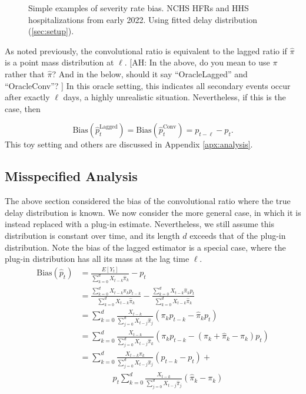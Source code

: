 \documentclass{article}
\newcommand{\ahcomment}[1]{{\color{teal}[AH: #1]}}
\begin{document}
\begin{figure}
\begin{subfigure}[b]{0.32\linewidth}
         \caption{}
         \label{fig:toy_primary}
     \end{subfigure}
        \caption{Simple examples of severity rate bias. NCHS HFRs and HHS hospitalizations from early 2022. Using fitted delay distribution (\ref{sec:setup}).}
        \label{fig:bias_ex_main}
\end{figure}


As noted previously, the convolutional ratio is equivalent to the lagged ratio if $\hat\pi$ is a point mass distribution at $\ell$.
\ahcomment{
  In the above, do you mean to use $\pi$ rather that $\hat{\pi}$?  And in the
  below, should it say ``OracleLagged'' and ``OracleConv''?
}
In this oracle setting, this indicates all secondary events occur after exactly $\ell$ days, a highly unrealistic situation. Nevertheless, if this is the case, then 

$$\text{Bias}(\hat{p}_t^\text{Lagged}) = \text{Bias}(\hat{p}_t^\text{Conv}) = p_{t-\ell}-p_t.$$
\noindent This toy setting and others are discussed in Appendix \ref{apx:analysis}.

\subsection{Misspecified Analysis}

The above section considered the bias of the convolutional ratio where the true delay distribution is known. We now consider the more general case, in which it is instead replaced with a plug-in estimate. Nevertheless, we still assume this distribution is constant over time, and its length $d$ exceeds that of the plug-in distribution. Note the bias of the lagged estimator is a special case, where the plug-in distribution has all its mass at the lag time $\ell$. 
\begin{align}\label{eq:MispBias}
    \text{Bias}(\hat{p}_t) &= \frac{E[Y_t]}{\sum_{k=0}^d X_{t-k}\hat\pi_k} - p_t \nonumber\\
    &= \frac{\sum_{k=0}^d X_{t-k}\pi_k p_{t-k}}{\sum_{k=0}^d X_{t-k}\hat\pi_k} - \frac{\sum_{k=0}^d X_{t-k}\hat\pi_k p_t}{\sum_{k=0}^d X_{t-k}\hat\pi_k}\nonumber \\
    &= \sum_{k=0}^d \frac{X_{t-k}}{\sum_{j=0}^d X_{t-j}\hat\pi_j}(\pi_k p_{t-k}-\hat\pi_k p_t)\nonumber \\
    &= \sum_{k=0}^d \frac{X_{t-k}}{\sum_{j=0}^d X_{t-j}\hat\pi_k}(\pi_k p_{t-k}-(\pi_k +\hat\pi_k-\pi_k) p_t)\nonumber \\
     &= \sum_{k=0}^d \frac{X_{t-k}\pi_k}{\sum_{j=0}^d X_{t-j}\hat\pi_j}(p_{t-k}-p_t) +\nonumber\\
     &\qquad\qquad p_t\sum_{k=0}^d \frac{X_{t-k}}{\sum_{j=0}^d X_{t-j}\hat\pi_j}(\hat\pi_k -\pi_k) 
\end{align}
\end{document}
